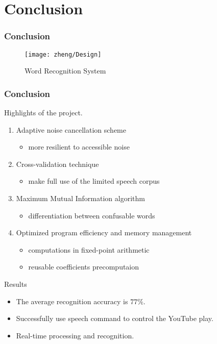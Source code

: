 \section{Conclusion}

\begin{frame}
\frametitle{Conclusion}
\begin{figure}[H]
\begin{center}
\texttt{[image: zheng/Design]} 
\caption{Word Recognition System}
\end{center}
\end{figure}
\end{frame}

\begin{frame}
\frametitle{Conclusion}
Highlights of the project.
\begin{enumerate}
	\item Adaptive noise cancellation scheme
	\begin{itemize}
		\item more resilient to accessible noise
	\end{itemize}
	\item Cross-validation technique
	\begin{itemize}
		\item make full use of the limited speech corpus
	\end{itemize}
	\item Maximum Mutual Information algorithm
	\begin{itemize}
		\item differentiation between confusable words
	\end{itemize}
	\item Optimized program efficiency and memory management
	\begin{itemize}
		\item computations in fixed-point arithmetic
		\item reusable coefficients precomputaion
	\end{itemize}
\end{enumerate}
\end{frame}

\begin{frame}
\begin{block}{Results}
\begin{itemize}
	\item The average recognition accuracy is $77\%$.
	\item Successfully use speech command to control the YouTube play.
	\item Real-time processing and recognition.
\end{itemize}
\end{block}
\end{frame}

